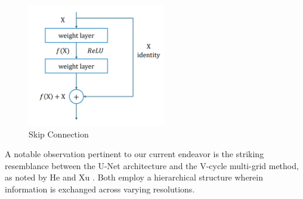 \begin{figure}[ht]
    \centering
    \includegraphics[width=6cm]{images/Theory-DL/Skip.png}
    \caption{Skip Connection \cite{he2016deep}} 
    \label{fig:Skip}
\end{figure}
A notable observation pertinent to our current endeavor is the striking resemblance between the U-Net architecture and the V-cycle multi-grid method, as noted by He and Xu \cite{HeXu2019}. Both employ a hierarchical structure wherein information is exchanged across varying resolutions.
